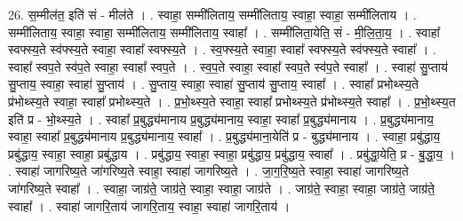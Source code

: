 \documentclass[17pt]{extarticle}
\begin{document}
26. स॒म्मील॑त॒ इति॑ सं - मील॑ते । . स्वाहा॒ सम्मी॑लिताय॒ सम्मी॑लिताय॒ स्वाहा॒ स्वाहा॒ सम्मी॑लिताय । . सम्मी॑लिताय॒ स्वाहा॒ स्वाहा॒ सम्मी॑लिताय॒ सम्मी॑लिताय॒ स्वाहा᳚ । . सम्मी॑लिता॒येति॒ सं - मी॒लि॒ता॒य॒ । . स्वाहा᳚ स्वफ्स्य॒ते स्व॑फ्स्य॒ते स्वाहा॒ स्वाहा᳚ स्वफ्स्य॒ते । . स्व॒फ्स्य॒ते स्वाहा॒ स्वाहा᳚ स्वफ्स्य॒ते स्व॑फ्स्य॒ते स्वाहा᳚ । . स्वाहा᳚ स्वप॒ते स्व॑प॒ते स्वाहा॒ स्वाहा᳚ स्वप॒ते । . स्व॒प॒ते स्वाहा॒ स्वाहा᳚ स्वप॒ते स्व॑प॒ते स्वाहा᳚ । . स्वाहा॑ सु॒प्ताय॑ सु॒प्ताय॒ स्वाहा॒ स्वाहा॑ सु॒प्ताय॑ । . सु॒प्ताय॒ स्वाहा॒ स्वाहा॑ सु॒प्ताय॑ सु॒प्ताय॒ स्वाहा᳚ । . स्वाहा᳚ प्रभोथ्स्य॒ते प्र॑भोथ्स्य॒ते स्वाहा॒ स्वाहा᳚ प्रभोथ्स्य॒ते । . प्र॒भो॒थ्स्य॒ते स्वाहा॒ स्वाहा᳚ प्रभोथ्स्य॒ते प्र॑भोथ्स्य॒ते स्वाहा᳚ । . प्र॒भो॒थ्स्य॒त इति॑ प्र - भो॒थ्स्य॒ते । . स्वाहा᳚ प्र॒बुद्ध्य॑मानाय प्र॒बुद्ध्य॑मानाय॒ स्वाहा॒ स्वाहा᳚ प्र॒बुद्ध्य॑मानाय । . प्र॒बुद्ध्य॑मानाय॒ स्वाहा॒ स्वाहा᳚ प्र॒बुद्ध्य॑मानाय प्र॒बुद्ध्य॑मानाय॒ स्वाहा᳚ । . प्र॒बुद्ध्य॑माना॒येति॑ प्र - बुद्ध्य॑मानाय । . स्वाहा॒ प्रबु॑द्धाय॒ प्रबु॑द्धाय॒ स्वाहा॒ स्वाहा॒ प्रबु॑द्धाय । . प्रबु॑द्धाय॒ स्वाहा॒ स्वाहा॒ प्रबु॑द्धाय॒ प्रबु॑द्धाय॒ स्वाहा᳚ । . प्रबु॑द्धा॒येति॒ प्र - बु॒द्धा॒य॒ । . स्वाहा॑ जागरिष्य॒ते जा॑गरिष्य॒ते स्वाहा॒ स्वाहा॑ जागरिष्य॒ते । . जा॒ग॒रि॒ष्य॒ते स्वाहा॒ स्वाहा॑ जागरिष्य॒ते जा॑गरिष्य॒ते स्वाहा᳚ । . स्वाहा॒ जाग्र॑ते॒ जाग्र॑ते॒ स्वाहा॒ स्वाहा॒ जाग्र॑ते । . जाग्र॑ते॒ स्वाहा॒ स्वाहा॒ जाग्र॑ते॒ जाग्र॑ते॒ स्वाहा᳚ । . स्वाहा॑ जागरि॒ताय॑ जागरि॒ताय॒ स्वाहा॒ स्वाहा॑ जागरि॒ताय॑ । \newline
\end{document}
